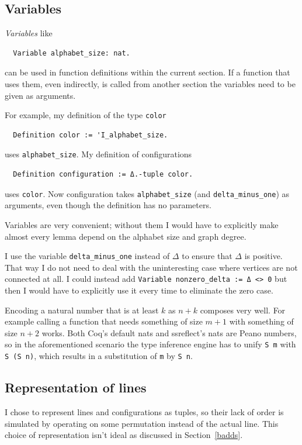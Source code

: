 \documentclass[english, 12pt, a4paper, sci, a-1b, online]{aaltothesis}
\newcommand\icoq[1]{\texttt{#1}}
\begin{document}
\subsection{Variables}

\emph{Variables} like
\begin{verbatim}
  Variable alphabet_size: nat.
\end{verbatim}
can be used in function definitions within the current section. If a function that uses them, even indirectly, is called from another section the variables need to be given as arguments.

For example, my definition of the type \icoq{color}
\begin{verbatim}
  Definition color := 'I_alphabet_size.
\end{verbatim}
uses \icoq{alphabet_size}. My definition of configurations
\begin{verbatim}
  Definition configuration := Δ.-tuple color.
\end{verbatim}
uses \icoq{color}. Now configuration takes \icoq{alphabet_size} (and \icoq{delta_minus_one}) as arguments, even though the definition has no parameters.

Variables are very convenient; without them I would have to explicitly make almost every lemma depend on the alphabet size and graph degree.

I use the variable \icoq{delta_minus_one} instead of $\Delta$ to ensure that $\Delta$ is positive. That way I do not need to deal with the uninteresting case where vertices are not connected at all. I could instead add \icoq{Variable nonzero_delta := Δ <> 0} but then I would have to explicitly use it every time to eliminate the zero case.

Encoding a natural number that is at least $k$ as $n + k$ composes very well. For example calling a function that needs something of size $m + 1$ with something of size $n + 2$ works. Both Coq's default nats and ssreflect's nats are Peano numbers, so in the aforementioned scenario the type inference engine has to unify \icoq{S m} with \icoq{S (S n)}, which results in a substitution of \icoq{m} by \icoq{S n}.

\subsection{Representation of lines}

I chose to represent lines and configurations as tuples, so their lack of order is simulated by operating on some permutation instead of the actual line. This choice of representation isn't ideal as discussed in Section~\ref{badds}.
\end{document}
